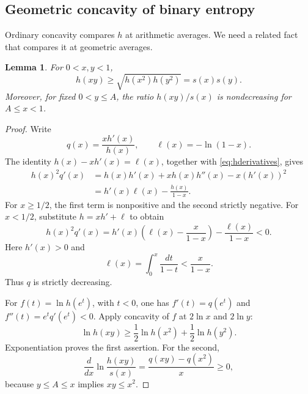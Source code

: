 \documentclass[11pt]{article}
\newtheorem{lemma}[theorem]{Lemma}
\theoremstyle{remark}
\begin{document}
\subsection{Geometric concavity of binary entropy}
Ordinary concavity compares \(h\) at arithmetic averages.
We need a related fact that compares it at geometric averages.

\begin{lemma}\label{lem:geometric}
For \(0<x,y<1\),
\[
h(xy)\ge\sqrt{h(x^2)h(y^2)}=s(x)s(y).
\]
Moreover, for fixed \(0<y\le A\), the ratio \(h(xy)/s(x)\)
is nondecreasing for \(A\le x<1\).
\end{lemma}

\begin{proof}
Write
\[
q(x)=\frac{xh'(x)}{h(x)},\qquad \ell(x)=-\ln(1-x).
\]
The identity \(h(x)-xh'(x)=\ell(x)\), together with
\eqref{eq:hderivatives}, gives
\begin{align*}
h(x)^2q'(x)
&=h(x)h'(x)+xh(x)h''(x)-x(h'(x))^2\\
&=h'(x)\ell(x)-\frac{h(x)}{1-x}.
\end{align*}
For \(x\ge1/2\), the first term is nonpositive and the second
strictly negative. For \(x<1/2\), substitute \(h=xh'+\ell\) to obtain
\[
h(x)^2q'(x)
=h'(x)\left(\ell(x)-\frac{x}{1-x}\right)
-\frac{\ell(x)}{1-x}<0.
\]
Here \(h'(x)>0\) and
\[
\ell(x)=\int_0^x\frac{dt}{1-t}<\frac{x}{1-x}.
\]
Thus \(q\) is strictly decreasing.

For \(f(t)=\ln h(e^t)\), with \(t<0\), one has
\(f'(t)=q(e^t)\) and \(f''(t)=e^tq'(e^t)<0\).
Apply concavity of \(f\) at \(2\ln x\) and \(2\ln y\):
\[
\ln h(xy)\ge\frac12\ln h(x^2)+\frac12\ln h(y^2).
\]
Exponentiation proves the first assertion.
For the second,
\[
\frac{d}{dx}\ln\frac{h(xy)}{s(x)}
=\frac{q(xy)-q(x^2)}{x}\ge0,
\]
because \(y\le A\le x\) implies \(xy\le x^2\).
\end{proof}
\end{document}
